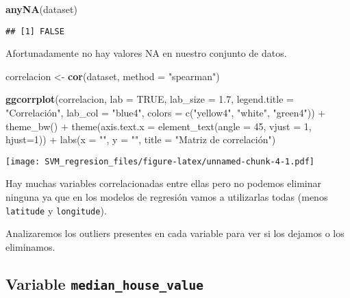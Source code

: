 \documentclass[
]{article}
\newenvironment{Shaded}{\begin{snugshade}}{\end{snugshade}}
\newcommand{\DataTypeTok}[1]{\textcolor[rgb]{0.13,0.29,0.53}{#1}}
\newcommand{\FloatTok}[1]{\textcolor[rgb]{0.00,0.00,0.81}{#1}}
\newcommand{\KeywordTok}[1]{\textcolor[rgb]{0.13,0.29,0.53}{\textbf{#1}}}
\newcommand{\NormalTok}[1]{#1}
\newcommand{\OtherTok}[1]{\textcolor[rgb]{0.56,0.35,0.01}{#1}}
\newcommand{\StringTok}[1]{\textcolor[rgb]{0.31,0.60,0.02}{#1}}
\begin{document}
\begin{Shaded}
\begin{Highlighting}[]
\KeywordTok{anyNA}\NormalTok{(dataset)}
\end{Highlighting}
\end{Shaded}

\begin{verbatim}
## [1] FALSE
\end{verbatim}

Afortunadamente no hay valores NA en nuestro conjunto de datos.

\begin{Shaded}
\begin{Highlighting}[]
\NormalTok{correlacion <-}\StringTok{ }\KeywordTok{cor}\NormalTok{(dataset, }
                   \DataTypeTok{method =} \StringTok{"spearman"}\NormalTok{)}

\KeywordTok{ggcorrplot}\NormalTok{(correlacion, }\DataTypeTok{lab =} \OtherTok{TRUE}\NormalTok{, }\DataTypeTok{lab_size =} \FloatTok{1.7}\NormalTok{, }\DataTypeTok{legend.title =} \StringTok{"Correlación", }
\StringTok{           lab_col = "}\NormalTok{blue4}\StringTok{", colors = c("}\NormalTok{yellow4}\StringTok{", "}\NormalTok{white}\StringTok{", "}\NormalTok{green4}\StringTok{")) +}
\StringTok{  theme_bw() +}
\StringTok{  theme(axis.text.x = element_text(angle = 45, vjust = 1, hjust=1)) +}
\StringTok{  labs(x = "", y = "", title = "}\NormalTok{Matriz de correlación")}
\end{Highlighting}
\end{Shaded}

\texttt{[image: SVM\_regresion\_files/figure-latex/unnamed-chunk-4-1.pdf]}

Hay muchas variables correlacionadas entre ellas pero no podemos
eliminar ninguna ya que en los modelos de regresión vamos a utilizarlas
todas (menos \texttt{latitude} y \texttt{longitude}).

Analizaremos los outliers presentes en cada variable para ver si los
dejamos o los eliminamos.

\hypertarget{variable-median_house_value}{%
\subsection{\texorpdfstring{Variable
\texttt{median\_house\_value}}{Variable median\_house\_value}}\label{variable-median_house_value}}
\end{document}
